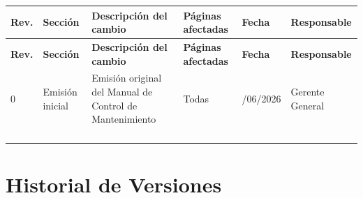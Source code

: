 \begin{longtable}{|>{\centering\arraybackslash}p{1.2cm}|>{\centering\arraybackslash}p{2.1cm}|p{4.2cm}|>{\centering\arraybackslash}p{2.2cm}|>{\centering\arraybackslash}p{1.8cm}|p{2.5cm}|}

\hline

\rowcolor{gray!20}

\textbf{Rev.} &
\textbf{Sección} &
\textbf{Descripción del cambio} &
\textbf{Páginas afectadas} &
\textbf{Fecha} &
\textbf{Responsable}

\\
\hline
\endfirsthead

\hline

\rowcolor{gray!20}

\textbf{Rev.} &
\textbf{Sección} &
\textbf{Descripción del cambio} &
\textbf{Páginas afectadas} &
\textbf{Fecha} &
\textbf{Responsable}

\\
\hline

\endhead

0 &
Emisión inicial &
Emisión original del Manual de Control de Mantenimiento &
Todas &
23/06/2026 &
Gerente General

\\
\hline

&
&
&
&
&
\\
\hline

&
&
&
&
&
\\
\hline

&
&
&
&
&
\\
\hline

&
&
&
&
&
\\
\hline

\end{longtable}

\vspace{0.7cm}


\section*{Historial de Versiones}

\renewcommand{\arraystretch}{1.35}

